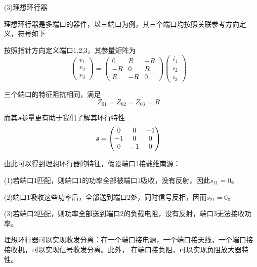     \par (3)理想环行器
    \par 理想环行器是多端口的器件，以三端口为例，其三个端口均按照关联参考方向定义，符号如下
    \begin{center}
    \end{center}
    \par 按照指针方向定义端口1,2,3，其参量矩阵为
    \[
    \begin{pmatrix}
        v_1 \\ v_2 \\ v_3
    \end{pmatrix}
    =
    \begin{pmatrix}
        0 & R & -R \\
        -R & 0 & R \\
        R & -R & 0 
    \end{pmatrix}
    \begin{pmatrix}
        i_1 \\ i_2 \\ i_3
    \end{pmatrix}    
    \]
    \par 三个端口的特征阻抗相同，满足
    \[
    Z_{01}=Z_{02}=Z_{03}=R    
    \]
    \par 而其\textbf{\textit{s}}参量更有助于我们了解其环行特性
    \[
    \textbf{\textit{s}}
    =
    \begin{pmatrix}
        0 & 0 & -1\\
        -1 & 0 & 0\\
        0 & -1 & 0
    \end{pmatrix}    
    \]
    \par 由此可以得到理想环行器的特征，假设端口1接戴维南源：
    \par (1)若端口1匹配，则端口1的功率全部被端口1吸收，没有反射，因此$s_{11}=0$。
    \par (2)端口1吸收这些功率后，全部送到端口2处，同时信号反相，因而$s_{21}=0$。
    \par (3)若端口2匹配，则功率全部送到端口2的负载电阻，没有反射，端口3无法接收功率。
    \par 理想环行器可以实现收发分离：在一个端口接电源，一个端口接天线，一个端口接接收机，可以实现信号收发分离。此外，
    在端口接负阻，可以实现负阻放大器特性。



